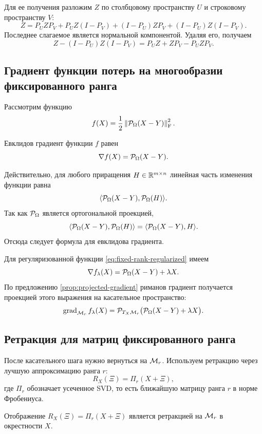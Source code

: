 Для ее получения разложим $Z$ по столбцовому пространству $U$ и строковому пространству $V$:
\[
Z=P_UZP_V+P_UZ(I-P_V)+(I-P_U)ZP_V+(I-P_U)Z(I-P_V).
\]
Последнее слагаемое является нормальной компонентой. Удаляя его, получаем
\[
Z-(I-P_U)Z(I-P_V)=P_UZ+ZP_V-P_UZP_V.
\]

\subsection{Градиент функции потерь на многообразии фиксированного ранга}

Рассмотрим функцию
\[
f(X)=\frac12\left\lVert \mathcal{P}_\Omega(X-Y) \right\rVert_{\mathrm F}^2.
\]

\begin{lemma}
\label{lemma:euclidean-gradient}
Евклидов градиент функции $f$ равен
\[
\nabla f(X)=\mathcal{P}_\Omega(X-Y).
\]
\end{lemma}

Действительно, для любого приращения $H\in\mathbb{R}^{m\times n}$ линейная часть изменения функции равна
\[
\langle \mathcal{P}_\Omega(X-Y),\mathcal{P}_\Omega(H)\rangle.
\]
Так как $\mathcal{P}_\Omega$ является ортогональной проекцией,
\[
\langle \mathcal{P}_\Omega(X-Y),\mathcal{P}_\Omega(H)\rangle
=
\langle \mathcal{P}_\Omega(X-Y),H\rangle.
\]
Отсюда следует формула для евклидова градиента.

Для регуляризованной функции \eqref{eq:fixed-rank-regularized} имеем
\[
\nabla f_\lambda(X)=\mathcal{P}_\Omega(X-Y)+\lambda X.
\]
По предложению \ref{prop:projected-gradient} риманов градиент получается проекцией этого выражения на касательное пространство:
\[
\operatorname{grad}_{\mathcal{M}_r} f_\lambda(X)
=
\mathcal{P}_{T_X\mathcal{M}_r}\bigl(\mathcal{P}_\Omega(X-Y)+\lambda X\bigr).
\]

\subsection{Ретракция для матриц фиксированного ранга}

После касательного шага нужно вернуться на $\mathcal{M}_r$. Используем ретракцию через лучшую аппроксимацию ранга $r$:
\begin{equation}
\label{eq:fixed-rank-retraction}
R_X(\Xi)=\Pi_r(X+\Xi),
\end{equation}
где $\Pi_r$ обозначает усеченное SVD, то есть ближайшую матрицу ранга $r$ в норме Фробениуса.

\begin{proposition}
\label{prop:svd-retraction}
Отображение $R_X(\Xi)=\Pi_r(X+\Xi)$ является ретракцией на $\mathcal{M}_r$ в окрестности $X$.
\end{proposition}

